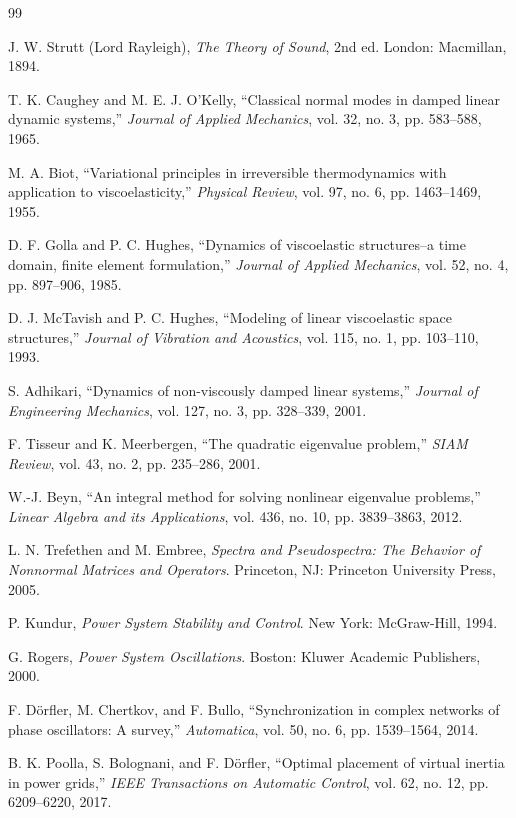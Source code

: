 \documentclass[11pt]{article}
\begin{document}
\begin{thebibliography}{99}

J. W. Strutt (Lord Rayleigh), \emph{The Theory of Sound}, 2nd ed. London:
Macmillan, 1894.

T. K. Caughey and M. E. J. O'Kelly, ``Classical normal modes in damped linear
dynamic systems,'' \emph{Journal of Applied Mechanics}, vol. 32, no. 3,
pp. 583--588, 1965.

M. A. Biot, ``Variational principles in irreversible thermodynamics with
application to viscoelasticity,'' \emph{Physical Review}, vol. 97, no. 6,
pp. 1463--1469, 1955.

D. F. Golla and P. C. Hughes, ``Dynamics of viscoelastic structures--a time
domain, finite element formulation,'' \emph{Journal of Applied Mechanics},
vol. 52, no. 4, pp. 897--906, 1985.

D. J. McTavish and P. C. Hughes, ``Modeling of linear viscoelastic space
structures,'' \emph{Journal of Vibration and Acoustics}, vol. 115, no. 1,
pp. 103--110, 1993.

S. Adhikari, ``Dynamics of non-viscously damped linear systems,''
\emph{Journal of Engineering Mechanics}, vol. 127, no. 3, pp. 328--339, 2001.

F. Tisseur and K. Meerbergen, ``The quadratic eigenvalue problem,''
\emph{SIAM Review}, vol. 43, no. 2, pp. 235--286, 2001.

W.-J. Beyn, ``An integral method for solving nonlinear eigenvalue problems,''
\emph{Linear Algebra and its Applications}, vol. 436, no. 10, pp. 3839--3863,
2012.

L. N. Trefethen and M. Embree, \emph{Spectra and Pseudospectra: The Behavior of
Nonnormal Matrices and Operators}. Princeton, NJ: Princeton University Press,
2005.

P. Kundur, \emph{Power System Stability and Control}. New York: McGraw-Hill,
1994.

G. Rogers, \emph{Power System Oscillations}. Boston: Kluwer Academic
Publishers, 2000.

F. D\"orfler, M. Chertkov, and F. Bullo, ``Synchronization in complex networks
of phase oscillators: A survey,'' \emph{Automatica}, vol. 50, no. 6,
pp. 1539--1564, 2014.

B. K. Poolla, S. Bolognani, and F. D\"orfler, ``Optimal placement of virtual
inertia in power grids,'' \emph{IEEE Transactions on Automatic Control},
vol. 62, no. 12, pp. 6209--6220, 2017.


\end{thebibliography}
\end{document}
